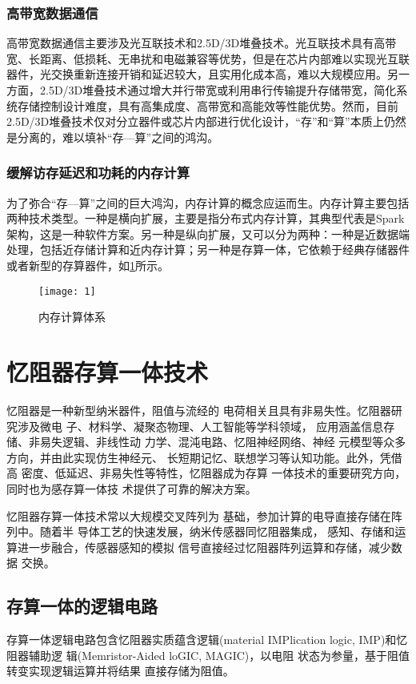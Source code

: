 \documentclass[withoutpreface,bwprint]{cumcmthesis}
\begin{document}
\subsubsection{高带宽数据通信}
高带宽数据通信主要涉及光互联技术和2.5D/3D堆叠技术。光互联技术具有高带宽、长距离、低损耗、无串扰和电磁兼容等优势，但是在芯片内部难以实现光互联器件，光交换重新连接开销和延迟较大，且实用化成本高，难以大规模应用。另一方面，2.5D/3D堆叠技术通过增大并行带宽或利用串行传输提升存储带宽，简化系统存储控制设计难度，具有高集成度、高带宽和高能效等性能优势。然而，目前2.5D/3D堆叠技术仅对分立器件或芯片内部进行优化设计，“存”和“算”本质上仍然是分离的，难以填补“存—算”之间的鸿沟。

\subsubsection{缓解访存延迟和功耗的内存计算}
为了弥合“存—算”之间的巨大鸿沟，内存计算的概念应运而生。内存计算主要包括两种技术类型。一种是横向扩展，主要是指分布式内存计算，其典型代表是Spark架构，这是一种软件方案。另一种是纵向扩展，又可以分为两种：一种是近数据端处理，包括近存储计算和近内存计算；另一种是存算一体，它依赖于经典存储器件或者新型的存算器件，如\cref{fig:1}所示。

\begin{figure}[H]
    \centering
    \texttt{[image: 1]}
    \caption{内存计算体系}
    \label{fig:1}
\end{figure}

\section{忆阻器存算一体技术}

忆阻器是一种新型纳米器件，阻值与流经的
电荷相关且具有非易失性。忆阻器研究涉及微电
子、材料学、凝聚态物理、人工智能等学科领域，
应用涵盖信息存储、非易失逻辑、非线性动
力学、混沌电路、忆阻神经网络、神经
元模型等众多方向，并由此实现仿生神经元、
长短期记忆、联想学习等认知功能。此外，凭借高
密度、低延迟、非易失性等特性，忆阻器成为存算
一体技术的重要研究方向，同时也为感存算一体技
术提供了可靠的解决方案。

忆阻器存算一体技术常以大规模交叉阵列为
基础，参加计算的电导直接存储在阵列中。随着半
导体工艺的快速发展，纳米传感器同忆阻器集成，
感知、存储和运算进一步融合，传感器感知的模拟
信号直接经过忆阻器阵列运算和存储，减少数据
交换。

\subsection{存算一体的逻辑电路}
存算一体逻辑电路包含忆阻器实质蕴含逻辑(material IMPlication logic, IMP)和忆阻器辅助逻
辑(Memristor-Aided loGIC, MAGIC)，以电阻
状态为参量，基于阻值转变实现逻辑运算并将结果
直接存储为阻值。
\end{document}
